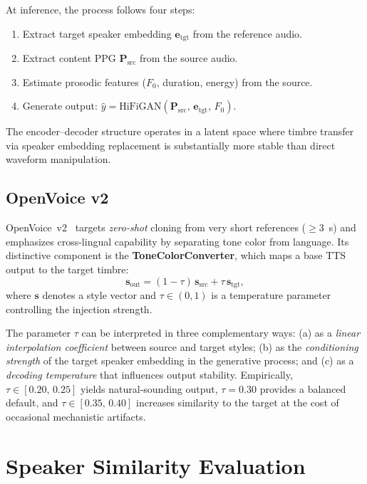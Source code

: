 \documentclass[conference]{IEEEtran}
\begin{document}
At inference, the process follows four steps:
\begin{enumerate}
  \item Extract target speaker embedding $\mathbf{e}_\text{tgt}$
        from the reference audio.
  \item Extract content PPG $\mathbf{P}_\text{src}$ from the source
        audio.
  \item Estimate prosodic features ($F_0$, duration, energy) from
        the source.
  \item Generate output:
        $\hat{y} = \text{HiFiGAN}(\mathbf{P}_\text{src},\,
        \mathbf{e}_\text{tgt},\, F_0)$.
\end{enumerate}
The encoder--decoder structure operates in a latent space where
timbre transfer via speaker embedding replacement is substantially
more stable than direct waveform manipulation.

\subsection{OpenVoice v2}
\label{sec:openvoice}

OpenVoice~v2~\cite{b_openvoice} targets \emph{zero-shot} cloning from
very short references (${\geq}3$~s) and emphasizes cross-lingual
capability by separating tone color from language.
Its distinctive component is the \textbf{ToneColorConverter}, which
maps a base TTS output to the target timbre:
\begin{equation}
  \mathbf{s}_\text{out} =
    (1-\tau)\,\mathbf{s}_\text{src} + \tau\,\mathbf{s}_\text{tgt},
  \label{eq:tau}
\end{equation}
where $\mathbf{s}$ denotes a style vector and $\tau\in(0,1)$ is a
temperature parameter controlling the injection strength.

The parameter $\tau$ can be interpreted in three complementary ways:
(a) as a \emph{linear interpolation coefficient} between source and
target styles; (b) as the \emph{conditioning strength} of the target
speaker embedding in the generative process; and (c) as a
\emph{decoding temperature} that influences output stability.
Empirically, $\tau\in[0.20,\,0.25]$ yields natural-sounding output,
$\tau=0.30$ provides a balanced default, and
$\tau\in[0.35,\,0.40]$ increases similarity to the target at the
cost of occasional mechanistic artifacts.

\section{Speaker Similarity Evaluation}
\label{sec:similarity}
\end{document}
